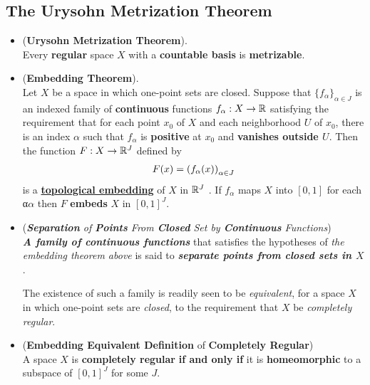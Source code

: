 \documentclass[11pt]{article}
\begin{document}
\subsection{The Urysohn Metrization Theorem}
\begin{itemize}
\item \begin{theorem} (\textbf{Urysohn Metrization Theorem}). \citep{munkres2000topology}\\
Every \textbf{regular} space $X$ with a \textbf{countable basis} is \textbf{metrizable}.
\end{theorem}

\item \begin{theorem} (\textbf{Embedding Theorem}).  \citep{munkres2000topology}\\
Let $X$ be a space in which one-point sets are closed. Suppose that $\{f_{\alpha}\}_{\alpha \in J}$ is an indexed family of \textbf{continuous} functions $f_{\alpha}: X \rightarrow {\mathbb R}$ satisfying the requirement that for each point $x_0$ of $X$ and each neighborhood $U$ of $x_0$, there is an index $\alpha$ such that $f_{\alpha}$ is \textbf{positive} at $x_0$ and \textbf{vanishes outside $U$}. Then the function $F : X \rightarrow {\mathbb R}^J$ defined by
\begin{align*}
F(x) = \left(f_{\alpha}(x)\right)_{\alpha \in J}
\end{align*}
is a \underline{\textbf{topological embedding}} of $X$ in ${\mathbb R}^J$ . If $f_{\alpha}$ maps $X$ into $[0, 1]$ for each α$\alpha$  then $F$ \textbf{embeds} $X$ in
$[0, 1]^J$.
\end{theorem}

\item \begin{definition} (\emph{\textbf{Separation} of \textbf{Points} From \textbf{Closed} Set by \textbf{Continuous} Functions})\\
\emph{\textbf{A family of continuous functions}} that satisfies the hypotheses of \emph{the embedding theorem above} is said to \emph{\textbf{separate points from closed sets in $X$}}. 

The existence of such a family is readily seen to be \emph{equivalent}, for a space $X$ in which one-point sets are \emph{closed}, to the requirement that $X$ be \emph{completely regular}.
\end{definition}

\item \begin{corollary} (\textbf{Embedding Equivalent Definition} of \textbf{Completely Regular}) \citep{munkres2000topology}\\
A space $X$ is \textbf{completely regular} \textbf{if and only if} it is \textbf{homeomorphic} to a subspace of $[0, 1]^J$ for some $J$.
\end{corollary}
\end{itemize}
\end{document}
